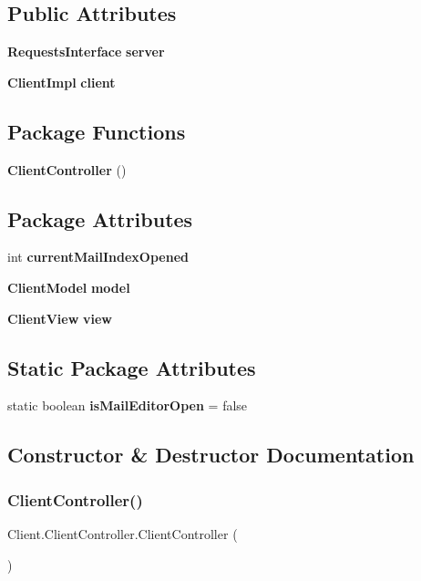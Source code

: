 \subsection*{Public Attributes}
\begin{DoxyCompactItemize}
\item 
\textbf{ Requests\+Interface} \textbf{ server}
\item 
\textbf{ Client\+Impl} \textbf{ client}
\end{DoxyCompactItemize}
\subsection*{Package Functions}
\begin{DoxyCompactItemize}
\item 
\textbf{ Client\+Controller} ()
\end{DoxyCompactItemize}
\subsection*{Package Attributes}
\begin{DoxyCompactItemize}
\item 
int \textbf{ current\+Mail\+Index\+Opened}
\item 
\textbf{ Client\+Model} \textbf{ model}
\item 
\textbf{ Client\+View} \textbf{ view}
\end{DoxyCompactItemize}
\subsection*{Static Package Attributes}
\begin{DoxyCompactItemize}
\item 
static boolean \textbf{ is\+Mail\+Editor\+Open} = false
\end{DoxyCompactItemize}


\subsection{Constructor \& Destructor Documentation}
\mbox{\label{class_client_1_1_client_controller_a808a160e141bab6ea29d486ec25faa8f}} 
\subsubsection{Client\+Controller()}
{\footnotesize\ttfamily Client.\+Client\+Controller.\+Client\+Controller (\begin{DoxyParamCaption}{ }\end{DoxyParamCaption})\hspace{0.3cm}{\ttfamily [package]}}




